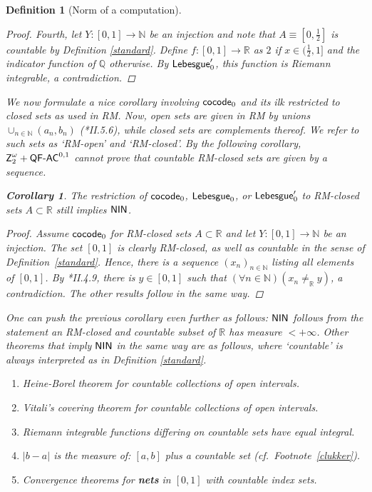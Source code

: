 \documentclass[reqno]{amsart}
\newtheorem{cor}[thm]{Corollary}
\newtheorem{defi}[thm]{Definition}
\def\Z{\textup{\textsf{Z}}}
\def\N{{\mathbb  N}}
\def\Q{{\mathbb  Q}}
\def\R{{\mathbb  R}}
\def\di{\rightarrow}
\def\QFAC{\textup{\textsf{QF-AC}}}
\def\LEB{\textup{\textsf{Lebesgue}}}
\def\cocode{\textup{\textsf{cocode}}}
\def\NIN{\textup{\textsf{NIN}}}
\numberwithin{equation}{section}
\numberwithin{thm}{section}
\begin{document}
\begin{defi}[Norm of a computation]
\begin{proof}
\smallskip

Fourth, let $Y:[0,1]\di \N$ be an injection and note that $A\equiv[0,\frac{1}{2}]$ is countable by Definition \ref{standard}.
Define $f:[0,1]\di \R$ as $2$ if $x\in (\frac12, 1]$ and the indicator function of $\Q$ otherwise.  By $\LEB_{0}'$, this function is Riemann integrable, a contradiction.      
\end{proof}
We now formulate a nice corollary involving $\cocode_{0}$ and its ilk restricted to closed sets as used in RM.
Now, open sets are given in RM by unions $\cup_{n\in \N}(a_{n}, b_{n})$ (\cite{simpson2}*{II.5.6}), while closed sets are complements thereof.  
We refer to such sets as `RM-open' and `RM-closed'.  By the following corollary, $\Z_{2}^{\omega}+\QFAC^{0,1}$ cannot prove that countable RM-closed sets are given by a sequence.  
\begin{cor}\label{frex}
The restriction of $\cocode_{0}$, $\LEB_{0}$, or $\LEB_{0}'$ to RM-closed sets $A\subset \R$ still implies $\NIN$.
\end{cor}
\begin{proof}
Assume $\cocode_{0}$ for RM-closed sets $A\subset \R$ and let $Y:[0,1]\di \N$ be an injection.  
The set $[0,1]$ is clearly RM-closed, as well as countable in the sense of Definition~\ref{standard}.
Hence, there is a sequence $(x_{n})_{n\in \N}$ listing all elements of $[0,1]$.  By \cite{simpson2}*{II.4.9}, there is $y\in [0,1]$ such that $(\forall n\in \N)(x_{n}\ne_{\R}y)$, a contradiction.
The other results follow in the same way.
\end{proof}
One can push the previous corollary even further as follows: $\NIN$ follows from the statement \emph{an RM-closed and countable subset of $\R$ has measure $<+\infty$.}
Other theorems that imply $\NIN$ in the same way are as follows, where `countable' is always interpreted as in Definition \ref{standard}.  %
\begin{enumerate}
\renewcommand{\theenumi}{\roman{enumi}}
\item Heine-Borel theorem for countable collections of open intervals.\label{bokes} 
\item Vitali's covering theorem for countable collections of open intervals.\label{bokes2} 
\item Riemann integrable functions differing on countable sets have equal integral.
\item $|b-a|$ is the measure of: $[a,b]$ plus a countable set (cf.\ Footnote~\ref{clukker}).  
\item Convergence theorems for \textbf{nets} in $[0,1]$ with countable index sets. 

\end{enumerate}
\end{defi}
\end{document}
